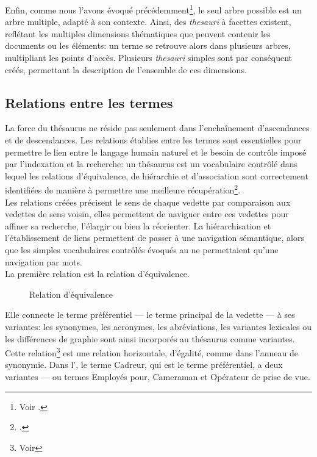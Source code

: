 

Enfin, comme nous l'avons évoqué précédemment\footnote{Voir .}, le seul arbre possible est un arbre multiple, adapté à son contexte. Ainsi, des \textit{thesauri} à facettes existent, reflétant les multiples dimensions thématiques que peuvent contenir les documents ou les éléments: un terme se retrouve alors dans plusieurs arbres, multipliant les points d'accès. Plusieurs \textit{thesauri} simples sont par conséquent créés, permettant la description de l'ensemble de ces dimensions.

\subsection{\label{I-C-2-b}Relations entre les termes}

La force du thésaurus ne réside pas seulement dans l'enchaînement d'ascendances et de descendances. Les relations établies entre les termes sont essentielles pour permettre le lien entre le langage humain naturel et le besoin de contrôle imposé par l'indexation et la recherche: un thésaurus est \og un vocabulaire contrôlé dans lequel les relations d'équivalence, de hiérarchie et d'association sont correctement identifiées de manière à permettre une meilleure récupération\fg{}\footcite{rosenfeld_information_2015}.\\

Les relations créées précisent le sens de chaque vedette par comparaison aux vedettes de sens voisin, elles permettent de naviguer entre ces vedettes pour affiner sa recherche, l'élargir ou bien la réorienter. La hiérarchisation et l'établissement de liens permettent de passer à une navigation sémantique, alors que les simples vocabulaires contrôlés évoqués au  ne permettaient qu'une navigation par mots.\\

La première relation est la relation d'équivalence.
\begin{wrapfigure}{L}{4cm}
	\centering
	
	\caption{Relation d'équivalence}
	\label{relation_equivalence}	
\end{wrapfigure} Elle connecte le terme préférentiel --- le terme principal de la vedette --- à ses variantes: les synonymes, les acronymes, les abréviations, les variantes lexicales ou les différences de graphie sont ainsi incorporés au thésaurus comme variantes. Cette relation\footnote{Voir } est une relation horizontale, d'égalité, comme dans l'anneau de synonymie. Dans l', le terme \og Cadreur\fg{}, qui est le terme préférentiel, a deux variantes --- ou termes \og Employés pour\fg{}, \og Cameraman\fg{} et \og Opérateur de prise de vue\fg{}.\\

